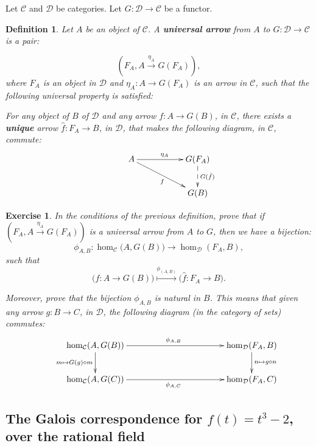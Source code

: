 \documentclass[a4paper,12pt]{article}
\newtheorem{Exercise}[Theorem]{Exercise}
\newtheorem{Definition}[Theorem]{Definition}
\newtheorem{Fundamental Theorem}{Fundamental Theorem}
\newcommand{\Cc}{ \mathcal{C} }
\newcommand{\Dc}{ \mathcal{D} }
\newcommand{\ra}[1]{\xrightarrow{#1}}
\begin{document}
Let $\Cc$ and $\Dc$ be categories. Let $G\colon \Dc \to \Cc$ be a functor.
\begin{Definition}\label{def:Uarrow}Let $A$ be an object of $\Cc$. A \textbf{universal arrow} from $A$ to $G\colon \Dc \to \Cc$ is a pair:

\[
\left(F_A, A \ra{\eta_A} G(F_A)\right),
\]
where $F_A$ is an object in $\Dc$ and $\eta_A\colon A \to  G(F_A)$ is an arrow in $\Cc$, such that the following universal property is  satisfied:

\begin{minipage}[t]{0.1\textwidth}
\end{minipage}
\begin{minipage}[t]{0.9\textwidth}
For any object of $B$ of $\Dc$ and any arrow $f\colon A \to G(B)$, in $\Cc$,  there exists a \textbf{unique} arrow $\hat{f}\colon F_A \to B$, in $\Dc$, that makes the following diagram, in $\Cc$, commute:
$$\xymatrix{& A \ar[drr]_f\ar[rr]^{\eta_A} && G(F_A) \ar@{-->}[d]^{G(\hat{f})}\\
&&& G(B)}
$$
\end{minipage}


\end{Definition}
\begin{Exercise}
 In the conditions of the previous definition, prove that if $\left(F_A, A \ra{\eta_A} G(F_A)\right)$ is a universal arrow from $A$ to $G$,
 then we have a bijection:
  \[\phi_{A,B}\colon \hom_\Cc\big(A,G(B)\big) \longrightarrow  \hom_\Dc (F_A,B), \]
  such that
 \[ \big (f\colon A \to G(B)\big) \stackrel{\phi_{(A,B)}}{\longmapsto} (\hat{f}\colon F_A \to B\big).\]

Moreover, prove that the bijection $\phi_{A,B}$ is natural in $B$. This means that given any arrow $g\colon B \to C$, in $\Dc$, the following diagram (in the category of sets) commutes:
\[
\xymatrix{ & \hom_\Cc(A,G(B)) \ar[d]_{m\mapsto G(g)\circ m } \ar[rrrr]^{\phi_{A,B}} &&&& \hom_\Dc(F_A,B)   \ar[d]^{n\mapsto g\circ n } \\
  & \hom_\Cc(A,G(C)) \ar[rrrr]_{\phi_{A,C}} &&&& \hom_\Dc(F_A,C)\\
}
\]


 \end{Exercise}

\subsection{The Galois correspondence for $f(t)=t^3-2$, over the rational field}
\label{Galois}
\end{document}
